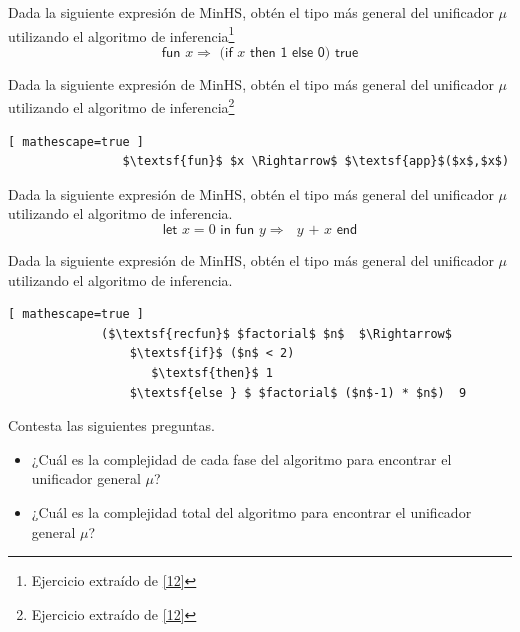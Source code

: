 \bigskip

    \begin{exercise} Dada la siguiente expresión de \textsf{MinHS}, obtén el tipo más general del unificador $\mu$ utilizando el algoritmo de inferencia\footnote{Ejercicio extraído de \hyperlink{12}{[12]}}
          \[
                \textsf{fun $x \Rightarrow$ (if $x$ then 1 else 0) true}
	\]
    \end{exercise}

\bigskip

    \begin{exercise} Dada la siguiente expresión de \textsf{MinHS}, obtén el tipo más general del unificador $\mu$ utilizando el algoritmo de inferencia\footnote{Ejercicio extraído de \hyperlink{12}{[12]}}
           \begin{lstlisting}[ mathescape=true ]
                $\textsf{fun}$ $x \Rightarrow$ $\textsf{app}$($x$,$x$)
           \end{lstlisting} 
    \end{exercise}

\bigskip

   \begin{exercise} Dada la siguiente expresión de \textsf{MinHS}, obtén el tipo más general del unificador $\mu$ utilizando el algoritmo de inferencia.
	\[
		\textsf{let $x = 0$ in fun $y \Rightarrow$  $y$ + $x$ end}
	\]
   \end{exercise}

\bigskip
     \begin{exercise} Dada la siguiente expresión de \textsf{MinHS}, obtén el tipo más general del unificador $\mu$ utilizando el algoritmo de inferencia.
          \begin{lstlisting}[ mathescape=true ]
             ($\textsf{recfun}$ $factorial$ $n$  $\Rightarrow$
                 $\textsf{if}$ ($n$ < 2) 
                    $\textsf{then}$ 1
                 $\textsf{else } $ $factorial$ ($n$-1) * $n$)  9
           \end{lstlisting}
     \end{exercise}

\bigskip

   \begin{exercise} Contesta las siguientes preguntas.\\
	\begin{itemize}
	    \item ¿Cuál es la complejidad de cada fase del algoritmo para encontrar el unificador general $\mu$?\\
           \item ¿Cuál es la complejidad total del algoritmo para encontrar el unificador general $\mu$?
	\end{itemize}
   \end{exercise}
